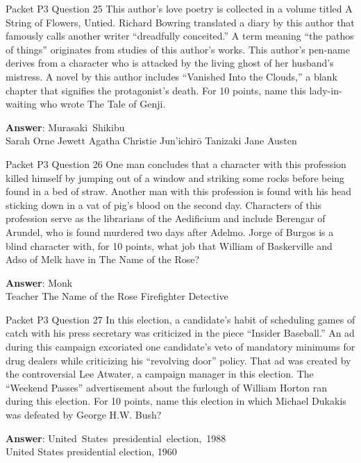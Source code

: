 \begin{frame}{Packet P3 Question 25}
This author’s love poetry is collected in a volume titled A String of Flowers, Untied. Richard Bowring translated a diary by this author that famously calls another writer “dreadfully   conceited.” A term meaning “the pathos of things” originates from studies of this author’s works. This author’s pen-name derives from a character who is attacked by the living ghost of her husband’s mistress. A novel by this author includes “Vanished Into the Clouds,” a blank chapter that signifies the protagonist’s death. For 10 points, name this lady-in-waiting who wrote The   Tale of Genji.      

\textbf{Answer}: Murasaki\ Shikibu\\
 Sarah Orne Jewett
 Agatha Christie
 Jun'ichirō Tanizaki
 Jane Austen
\end{frame}

\begin{frame}{Packet P3 Question 26}
One man concludes that a character with this profession killed himself by jumping out of a window and striking some rocks before being found in a bed of straw. Another man with this profession is found with his head sticking down in a vat of pig's blood on the second day. Characters of this profession serve as the librarians   of the Aedificium and include Berengar of Arundel, who is found murdered two days after Adelmo. Jorge of Burgos is a blind character with, for 10 points, what job that William of Baskerville and Adso of Melk have in   The Name of the Rose?    

\textbf{Answer}: Monk\\
 Teacher
 The Name of the Rose
 Firefighter
 Detective
\end{frame}

\begin{frame}{Packet P3 Question 27}
In this election, a candidate's habit of scheduling games of catch with his press secretary was criticized in the piece ``Insider Baseball.'' An ad during this campaign excoriated one candidate's veto of mandatory minimums for drug dealers while criticizing his ``revolving door'' policy. That ad was created by the controversial Lee Atwater, a campaign manager in this election. The ``Weekend Passes'' advertisement about the furlough of William Horton ran during this election. For 10 points, name this election in which Michael Dukakis was defeated       by George H.W. Bush?  

\textbf{Answer}: United\ States\ presidential\ election,\ 1988\\
 United States presidential election, 1960
\end{frame}

